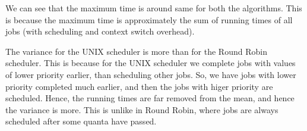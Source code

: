 \documentclass[]{article}
\begin{document}
We can see that the maximum time is around same for both the algorithms. This is because the maximum time is approximately the sum of running times of all jobs (with scheduling and context switch overhead). 

The variance for the UNIX scheduler is more than for the Round Robin scheduler. This is because for the UNIX scheduler we complete jobs with values of lower priority earlier, than scheduling other jobs. So, we have jobs with lower priority completed much earlier, and then the jobs with higer priority are scheduled. Hence, the running times are far removed from the mean, and hence the variance is more. This is unlike in Round Robin, where jobs are always scheduled after some quanta have passed.
\end{document}
